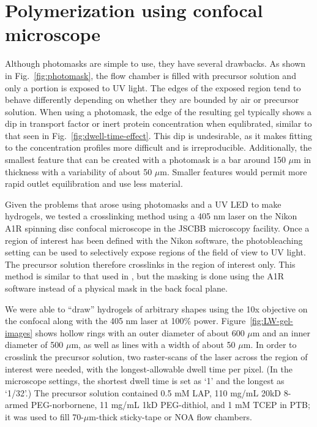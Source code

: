 \section{Polymerization using confocal microscope}
\label{sec:confocal-crosslinking}

Although photomasks are simple to use, they have several drawbacks.  As shown in Fig.~\ref{fig:photomask}, the flow chamber is filled with precursor solution and only a portion is exposed to UV light.  The edges of the exposed region tend to behave differently depending on whether they are bounded by air or precursor solution.  When using a photomask, the edge of the resulting gel typically shows a dip in transport factor or inert protein concentration when equlibrated, similar to that seen in Fig.~\ref{fig:dwell-time-effect}.  This dip is undesirable, as it makes fitting to the concentration profiles more difficult and is irreproducible.  Additionally, the smallest feature that can be created with a photomask is a bar around 150 $\mu$m in thickness with a variability of about 50 $\mu$m.  Smaller features would permit more rapid outlet equilibration and use less material.

Given the problems that arose using photomasks and a UV LED to make hydrogels, we tested a crosslinking method using a 405 nm laser on the Nikon A1R spinning disc confocal microscope in the JSCBB microscopy facility.  Once a region of interest has been defined with the Nikon software, the photobleaching setting can be used to selectively expose regions of the field of view to UV light.  The precursor solution therefore crosslinks in the region of interest only.  This method is similar to that used in \cite{paustian13}, but the masking is done using the A1R software instead of a physical mask in the back focal plane.

We were able to ``draw'' hydrogels of arbitrary shapes using the 10x objective on the confocal along with the 405 nm laser at 100\% power.  Figure~\ref{fig:LW-gel-images} shows hollow rings with an outer diameter of about 600 $\mu$m and an inner diameter of 500 $\mu$m, as well as lines with a width of about 50 $\mu$m.  In order to crosslink the precursor solution, two raster-scans of the laser across the region of interest were needed, with the longest-allowable dwell time per pixel.  (In the microscope settings, the shortest dwell time is set as `1' and the longest as `1/32'.)  The precursor solution contained 0.5 mM LAP, 110 mg/mL 20kD 8-armed PEG-norbornene, 11 mg/mL 1kD PEG-dithiol, and 1 mM TCEP in PTB; it was used to fill 70-$\mu$m-thick sticky-tape or NOA flow chambers.

